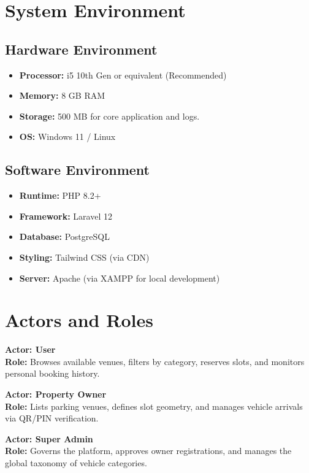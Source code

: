 \section{System Environment}

\subsection{Hardware Environment}
\begin{itemize}
    \item \textbf{Processor:} i5 10th Gen or equivalent (Recommended)
    \item \textbf{Memory:} 8 GB RAM
    \item \textbf{Storage:} 500 MB for core application and logs.
    \item \textbf{OS:} Windows 11 / Linux
\end{itemize}

\subsection{Software Environment}
\begin{itemize}
    \item \textbf{Runtime:} PHP 8.2+
    \item \textbf{Framework:} Laravel 12
    \item \textbf{Database:} PostgreSQL
    \item \textbf{Styling:} Tailwind CSS (via CDN)
    \item \textbf{Server:} Apache (via XAMPP for local development)
\end{itemize}

\section{Actors and Roles}

\textbf{Actor: User}\\
\textbf{Role:} Browses available venues, filters by category, reserves slots, and monitors personal booking history.

\textbf{Actor: Property Owner}\\
\textbf{Role:} Lists parking venues, defines slot geometry, and manages vehicle arrivals via QR/PIN verification.

\textbf{Actor: Super Admin}\\
\textbf{Role:} Governs the platform, approves owner registrations, and manages the global taxonomy of vehicle categories.

